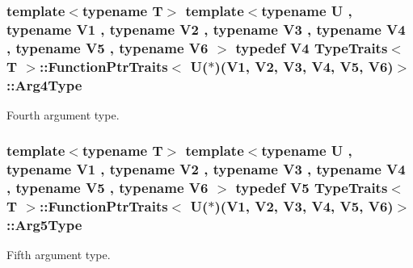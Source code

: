 \subsubsection[{\texorpdfstring{Arg4\+Type}{Arg4Type}}]{\setlength{\rightskip}{0pt plus 5cm}template$<$typename T$>$ template$<$typename U , typename V1 , typename V2 , typename V3 , typename V4 , typename V5 , typename V6 $>$ typedef V4 {\bf Type\+Traits}$<$ T $>$\+::{\bf Function\+Ptr\+Traits}$<$ U($\ast$)(V1, V2, V3, V4, V5, V6)$>$\+::{\bf Arg4\+Type}}\hypertarget{structTypeTraits_1_1FunctionPtrTraits_3_01U_07_5_08_07V1_00_01V2_00_01V3_00_01V4_00_01V5_00_01V6_08_4_a48b3911e05ece280c5b7e002d3372123}{}\label{structTypeTraits_1_1FunctionPtrTraits_3_01U_07_5_08_07V1_00_01V2_00_01V3_00_01V4_00_01V5_00_01V6_08_4_a48b3911e05ece280c5b7e002d3372123}
Fourth argument type. 
\subsubsection[{\texorpdfstring{Arg5\+Type}{Arg5Type}}]{\setlength{\rightskip}{0pt plus 5cm}template$<$typename T$>$ template$<$typename U , typename V1 , typename V2 , typename V3 , typename V4 , typename V5 , typename V6 $>$ typedef V5 {\bf Type\+Traits}$<$ T $>$\+::{\bf Function\+Ptr\+Traits}$<$ U($\ast$)(V1, V2, V3, V4, V5, V6)$>$\+::{\bf Arg5\+Type}}\hypertarget{structTypeTraits_1_1FunctionPtrTraits_3_01U_07_5_08_07V1_00_01V2_00_01V3_00_01V4_00_01V5_00_01V6_08_4_a2ac0a8dc03328fe76974f96c7df33f69}{}\label{structTypeTraits_1_1FunctionPtrTraits_3_01U_07_5_08_07V1_00_01V2_00_01V3_00_01V4_00_01V5_00_01V6_08_4_a2ac0a8dc03328fe76974f96c7df33f69}
Fifth argument type. 
